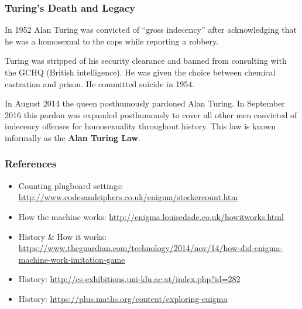 \documentclass{beamer}
\newcommand{\<}{\langle}
\renewcommand{\>}{\rangle}
\begin{document}
\begin{frame}
\begin{columns}
\begin{column}{.5\textwidth}
\begin{figure}
\end{figure}
\end{column}
\end{columns}
\end{frame}

\begin{frame}
\frametitle{Turing's Death and Legacy}

In 1952 Alan Turing was convicted of ``gross indecency'' after acknowledging that he was a homosexual to the cops while reporting a robbery. \newline

Turing was stripped of his security clearance and banned from consulting with the GCHQ (British intelligence). He was given the choice between chemical castration and prison. He committed suicide in 1954.\newline

In August 2014 the queen posthumously pardoned Alan Turing. In September 2016 this pardon was expanded posthumously to cover all other men convicted of indecency offenses for homosexuality throughout history. This law is known informally as the \textbf{Alan Turing Law}.
\end{frame}

\begin{frame}
\frametitle{References}

\begin{itemize}
\item Counting plugboard settings: \url{http://www.codesandciphers.co.uk/enigma/steckercount.htm}
\item How the machine works: \url{http://enigma.louisedade.co.uk/howitworks.html}
\item History \& How it works: \url{https://www.theguardian.com/technology/2014/nov/14/how-did-enigma-machine-work-imitation-game}
\item History: \url{http://cs-exhibitions.uni-klu.ac.at/index.php?id=282}
\item History: \url{https://plus.maths.org/content/exploring-enigma}
\end{itemize}
\end{frame}
\end{document}
